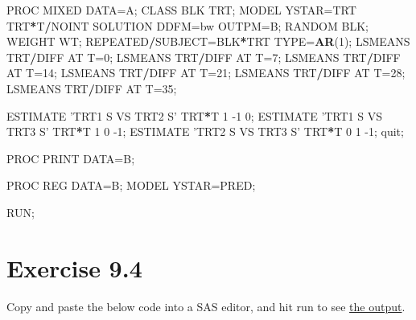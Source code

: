 \documentclass[]{book}
\newenvironment{Shaded}{\begin{snugshade}}{\end{snugshade}}
\newcommand{\DecValTok}[1]{\textcolor[rgb]{0.00,0.00,0.81}{#1}}
\newcommand{\KeywordTok}[1]{\textcolor[rgb]{0.13,0.29,0.53}{\textbf{#1}}}
\newcommand{\NormalTok}[1]{#1}
\newcommand{\OperatorTok}[1]{\textcolor[rgb]{0.81,0.36,0.00}{\textbf{#1}}}
\newcommand{\StringTok}[1]{\textcolor[rgb]{0.31,0.60,0.02}{#1}}
\begin{document}
\begin{Shaded}
\begin{Highlighting}[]
\NormalTok{PROC MIXED DATA=A;}
\NormalTok{CLASS BLK TRT;}
\NormalTok{MODEL YSTAR=TRT TRT}\OperatorTok{*}\NormalTok{T}\OperatorTok{/}\NormalTok{NOINT SOLUTION DDFM=bw OUTPM=B;}
\NormalTok{RANDOM BLK;}
\NormalTok{WEIGHT WT;}
\NormalTok{REPEATED}\OperatorTok{/}\NormalTok{SUBJECT=BLK}\OperatorTok{*}\NormalTok{TRT TYPE=}\KeywordTok{AR}\NormalTok{(}\DecValTok{1}\NormalTok{);}
\NormalTok{LSMEANS TRT}\OperatorTok{/}\NormalTok{DIFF AT T=}\DecValTok{0}\NormalTok{;}
\NormalTok{LSMEANS TRT}\OperatorTok{/}\NormalTok{DIFF AT T=}\DecValTok{7}\NormalTok{;}
\NormalTok{LSMEANS TRT}\OperatorTok{/}\NormalTok{DIFF AT T=}\DecValTok{14}\NormalTok{;}
\NormalTok{LSMEANS TRT}\OperatorTok{/}\NormalTok{DIFF AT T=}\DecValTok{21}\NormalTok{;}
\NormalTok{LSMEANS TRT}\OperatorTok{/}\NormalTok{DIFF AT T=}\DecValTok{28}\NormalTok{;}
\NormalTok{LSMEANS TRT}\OperatorTok{/}\NormalTok{DIFF AT T=}\DecValTok{35}\NormalTok{;}

\NormalTok{ESTIMATE }\StringTok{'TRT1 S VS TRT2 S'}\NormalTok{ TRT}\OperatorTok{*}\NormalTok{T }\DecValTok{1} \DecValTok{-1} \DecValTok{0}\NormalTok{;}
\NormalTok{ESTIMATE }\StringTok{'TRT1 S VS TRT3 S'}\NormalTok{ TRT}\OperatorTok{*}\NormalTok{T }\DecValTok{1} \DecValTok{0} \DecValTok{-1}\NormalTok{;}
\NormalTok{ESTIMATE }\StringTok{'TRT2 S VS TRT3 S'}\NormalTok{ TRT}\OperatorTok{*}\NormalTok{T }\DecValTok{0} \DecValTok{1} \DecValTok{-1}\NormalTok{;}
\NormalTok{quit;}

\NormalTok{PROC PRINT DATA=B;}

\NormalTok{PROC REG DATA=B;}
\NormalTok{MODEL YSTAR=PRED;}

\NormalTok{RUN;}
\end{Highlighting}
\end{Shaded}

\hypertarget{exercise-9.4}{%
\section{Exercise 9.4}\label{exercise-9.4}}

Copy and paste the below code into a SAS editor, and hit run to see \href{https://github.com/luckymehra/epidem-exercises/blob/master/sas_output/ex9_4.pdf}{the output}.
\end{document}
